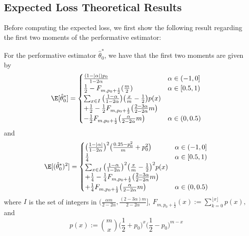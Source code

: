 \subsection{Expected Loss Theoretical Results} \label{sec: expected_loss_additional}
Before computing the expected loss, we first show the following result regarding the first two moments of the performative estimator: 

\begin{lemma} \label{lemma: moments}
	For the performative estimator $\hat{\theta}_0^\ast$, we have that the first two moments are given by
\begin{equation*}
\E[\hat{\theta}_0^\ast] = 
\begin{cases}
\frac{(1 - |\alpha|) p_0}{1-2\alpha} & \alpha \in (-1, 0]\\
\frac12 - F_{m, p_0 + \frac12} (\frac{m}{2}) & \alpha \in [0.5, 1)\\
\sum_{x \in I} \big(\frac{1 - \alpha}{1-2\alpha}\big) \big(\frac{x}{m} - \frac12 \big) p(x) & \\
+ \frac12  - \frac12 F_{m, p_0 + \frac12}\big( \frac{2 - 3\alpha}{2-2\alpha}m \big) & \\
 - \frac12 F_{m, p_0 + \frac12}\big( \frac{\alpha }{2-2\alpha}m\big)  & \alpha \in (0, 0.5)
\end{cases}
\end{equation*}
and 
\begin{equation*}
\E[(\hat{\theta}_0^\ast)^2] = 
\begin{cases}
\big( \frac{1-|\alpha|}{1-2\alpha}\big)^2 \big( \frac{0.25 - p_0^2}{m} + p_0^2 \big) & \alpha \in (-1, 0]\\
\frac14 & \alpha \in [0.5, 1)\\
\sum_{x \in I} \big(\frac{1 - \alpha}{1-2\alpha}\big)^2 \big(\frac{x}{m} - \frac12 \big)^2 p(x)  & \\
+ \frac14  - \frac14 F_{m, p_0 + \frac12}\big( \frac{2 - 3\alpha}{2-2\alpha}m \big) & \\
+ \frac14 F_{m, p_0 + \frac12}\big( \frac{\alpha }{2-2\alpha}m\big)  & \alpha \in (0, 0.5) 
\end{cases}
\end{equation*}
where $I$ is the set of integers in $\big(\frac{\alpha m}{2-2\alpha}, \frac{(2-3\alpha)m}{2-2\alpha} \big]$, $F_{m, p_0 + \frac12} (x) := \sum_{k=0}^{\lfloor x \rfloor} p(x),$ and 
\begin{equation*}
p(x) := \binom{m}{x} \bigg(\frac12 + p_0\bigg)^x \bigg(\frac12 - p_0\bigg)^{m-x}
\end{equation*}
\end{lemma}
